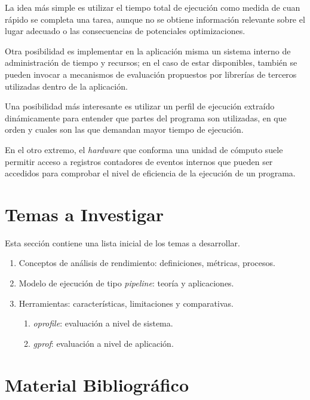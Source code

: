 \documentclass[a4paper]{article}
\begin{document}
La idea m\'as simple es utilizar el tiempo total de ejecuci\'on como medida de
cuan r\'apido se completa una tarea, aunque no se obtiene informaci\'on
relevante sobre el lugar adecuado o las consecuencias de potenciales
optimizaciones.

\smallskip

Otra posibilidad es implementar en la aplicaci\'on misma un sistema interno de
administraci\'on de tiempo y recursos; en el caso de estar disponibles,
tambi\'en se pueden invocar a mecanismos de evaluaci\'on propuestos por
librer\'ias de terceros utilizadas dentro de la aplicaci\'on.

\smallskip

Una posibilidad m\'as interesante es utilizar un perfil de ejecuci\'on
extra\'ido din\'amicamente para entender que partes del programa son
utilizadas, en que orden y cuales son las que demandan mayor tiempo de
ejecuci\'on.

\smallskip

En el otro extremo, el {\it hardware} que conforma una unidad de c\'omputo
suele permitir acceso a registros contadores de eventos internos que pueden
ser accedidos para comprobar el nivel de eficiencia de la ejecuci\'on de un
programa.

\section{Temas a Investigar}

Esta secci\'on contiene una lista inicial de los temas a desarrollar.

\begin{enumerate}
\item Conceptos de an\'alisis de rendimiento: definiciones, m\'etricas,
  procesos.
\item Modelo de ejecuci\'on de tipo {\it pipeline}: teor\'ia y aplicaciones.
\item Herramientas: caracter\'isticas, limitaciones y comparativas.
\begin{enumerate}
\item {\it oprofile}: evaluaci\'on a nivel de sistema.
\item {\it gprof}: evaluaci\'on a nivel de aplicaci\'on.
\end{enumerate}
\end{enumerate}

\section{Material Bibliogr\'afico}
\end{document}
